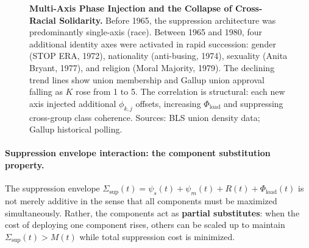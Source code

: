 \documentclass[12pt,openany]{book}
\begin{document}
\begin{figure}[htbp]
\caption{\textbf{Multi-Axis Phase Injection and the Collapse of Cross-Racial Solidarity.} Before 1965, the suppression architecture was predominantly single-axis (race). Between 1965 and 1980, four additional identity axes were activated in rapid succession: gender (STOP ERA, 1972), nationality (anti-busing, 1974), sexuality (Anita Bryant, 1977), and religion (Moral Majority, 1979). The declining trend lines show union membership and Gallup union approval falling as $K$ rose from 1 to 5. The correlation is structural: each new axis injected additional $\phi_{k,j}$ offsets, increasing $\Phi_{\text{load}}$ and suppressing cross-group class coherence. Sources: BLS union density data; Gallup historical polling.}
\label{fig:axis_activation}
\end{figure}

\paragraph{Suppression envelope interaction: the component substitution property.}
The suppression envelope $\Sigma_{\text{sup}}(t) = \psi_s(t) + \psi_m(t) + R(t) + \Phi_{\text{load}}(t)$ is not merely additive in the sense that all components must be maximized simultaneously. Rather, the components act as \textbf{partial substitutes}: when the cost of deploying one component rises, others can be scaled up to maintain $\Sigma_{\text{sup}}(t) > M(t)$ while total suppression cost is minimized.
\end{document}
